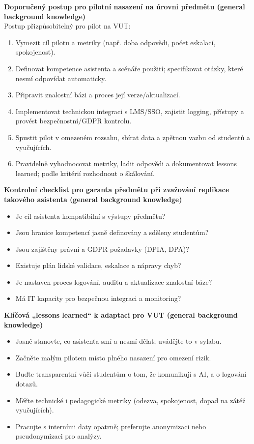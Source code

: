 \documentclass{report}%
\begin{document}
\bigskip
\textbf{Doporučený postup pro pilotní nasazení na úrovni předmětu (general background knowledge)}\\
Postup přizpůsobitelný pro pilot na VUT:
\begin{enumerate}
  \item Vymezit cíl pilotu a metriky (např. doba odpovědi, počet eskalací, spokojenost).
  \item Definovat kompetence asistenta a scénáře použití; specifikovat otázky, které nesmí odpovídat automaticky.
  \item Připravit znalostní bázi a proces její verze/aktualizací.
  \item Implementovat technickou integraci s LMS/SSO, zajistit logging, přístupy a provést bezpečnostní/GDPR kontrolu.
  \item Spustit pilot v omezeném rozsahu, sbírat data a zpětnou vazbu od studentů a vyučujících.
  \item Pravidelně vyhodnocovat metriky, ladit odpovědi a dokumentovat lessons learned; podle kritérií rozhodnout o škálování.
\end{enumerate}

\bigskip
\textbf{Kontrolní checklist pro garanta předmětu při zvažování replikace takového asistenta (general background knowledge)}\\
\begin{itemize}
  \item Je cíl asistenta kompatibilní s výstupy předmětu?
  \item Jsou hranice kompetencí jasně definovány a sděleny studentům?
  \item Jsou zajištěny právní a GDPR požadavky (DPIA, DPA)?
  \item Existuje plán lidské validace, eskalace a nápravy chyb?
  \item Je nastaven proces logování, auditu a aktualizace znalostní báze?
  \item Má IT kapacity pro bezpečnou integraci a monitoring?
\end{itemize}

\bigskip
\textbf{Klíčová „lessons learned“ k adaptaci pro VUT (general background knowledge)}\\
\begin{itemize}
  \item Jasně stanovte, co asistenta smí a nesmí dělat; uvádějte to v sylabu.
  \item Začněte malým pilotem místo plného nasazení pro omezení rizik.
  \item Buďte transparentní vůči studentům o tom, že komunikují s AI, a o logování dotazů.
  \item Měřte technické i pedagogické metriky (odezva, spokojenost, dopad na zátěž vyučujících).
  \item Pracujte s interními daty opatrně; preferujte anonymizaci nebo pseudonymizaci pro analýzy.
\end{itemize}
\end{document}
